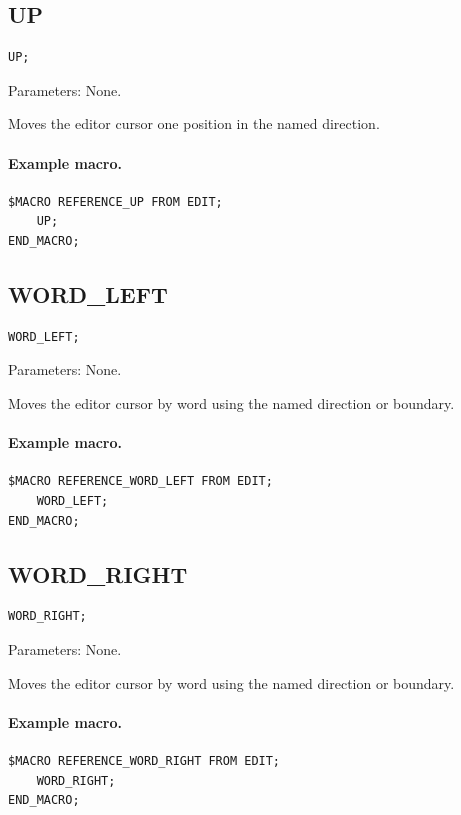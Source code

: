 \documentclass[a4paper,10pt,twoside,openany]{book}
\begin{document}
\label{prim:procedure-up}
\subsection*{UP}
\begin{verbatim}
UP;
\end{verbatim}
Parameters: None.

Moves the editor cursor one position in the named direction.

\paragraph{Example macro.}
\begin{verbatim}
$MACRO REFERENCE_UP FROM EDIT;
    UP;
END_MACRO;
\end{verbatim}

\label{prim:procedure-word-left}
\subsection*{WORD\_LEFT}
\begin{verbatim}
WORD_LEFT;
\end{verbatim}
Parameters: None.

Moves the editor cursor by word using the named direction or boundary.

\paragraph{Example macro.}
\begin{verbatim}
$MACRO REFERENCE_WORD_LEFT FROM EDIT;
    WORD_LEFT;
END_MACRO;
\end{verbatim}

\label{prim:procedure-word-right}
\subsection*{WORD\_RIGHT}
\begin{verbatim}
WORD_RIGHT;
\end{verbatim}
Parameters: None.

Moves the editor cursor by word using the named direction or boundary.

\paragraph{Example macro.}
\begin{verbatim}
$MACRO REFERENCE_WORD_RIGHT FROM EDIT;
    WORD_RIGHT;
END_MACRO;
\end{verbatim}
\end{document}
